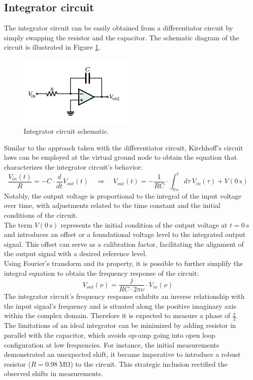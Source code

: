 	\newpage
	\subsection{Integrator circuit}
		The integrator circuit can be easily obtained from a differentiator circuit by simply swapping the resistor and the capacitor. 
		The schematic diagram of the circuit is illustrated in Figure \ref{fig:integrator_circuit}. 
		\begin{figure}[H]
		    \centering
		    \includegraphics[width=0.5\textwidth]{figures/integrator/circuit.png}
		    \caption{Integrator circuit schematic.}
		    \label{fig:integrator_circuit}
		\end{figure}
		\noindent
		Similar to the approach taken with the differentiator circuit, Kirchhoff's circuit laws can be employed at the virtual ground node to obtain the equation that characterizes the integrator circuit's behavior: $$ \frac{V_{in}(t)}{R} = - C \cdot \frac{d}{dt}V_{out}(t) \quad \Longrightarrow \quad V_{out}(t) = - \frac{1}{RC} \cdot \int_{\SI{0}{\second}}^t d\tau \ V_{in}(\tau) + V(\SI{0}{\second}) $$
		Notably, the output voltage is proportional to the integral of the input voltage over time, with adjustments related to the time constant and the initial conditions of the circuit. \\
		The term $V(\SI{0}{\second})$ represents the initial condition of the output voltage at $t=\SI{0}{\second}$ and introduces an offset or a foundational voltage level to the integrated output signal. 
		This offset can serve as a calibration factor, facilitating the alignment of the output signal with a desired reference level. \\
		Using Fourier's transform and its property, it is possible to further simplify the integral equation to obtain the frequency response of the circuit: 
		$$ V_{out}(\nu) = \frac{j}{RC \cdot 2 \pi \nu} \cdot V_{in}(\nu) $$
		The integrator circuit's frequency response exhibits an inverse relationship with the input signal's frequency and is situated along the positive imaginary axis within the complex domain.
		Therefore it is expected to measure a phase of $\frac{\pi}{2}$. \\
		The limitations of an ideal integrator can be minimized by adding resistor in parallel with the capacitor, which avoids op-amp going into open loop configuration at low frequencies.
		For instance, the initial measurements demonstrated an unexpected shift, it became imperative to introduce a robust resistor ($R=\SI{0.98}{\mega\ohm}$) to the circuit. 
		This strategic inclusion rectified the observed shifts in measurements. 
